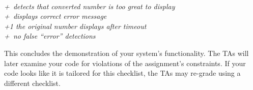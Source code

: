 \begin{enumerate}
 \\
    \textit{+\textonehalf\ detects that converted number is too great to
    display} \\
    \textit{+\textonequarter\ displays correct error message}
 \\
    \textit{+1 the original number displays after timeout}
 \\
    \textit{+\textonequarter\ no false ``error'' detections}
\end{enumerate}

This concludes the demonstration of your system's functionality. The TAs will
later examine your code for violations of the assignment's constraints. If your
code looks like it is tailored for this checklist, the TAs may re-grade using a
different checklist.

